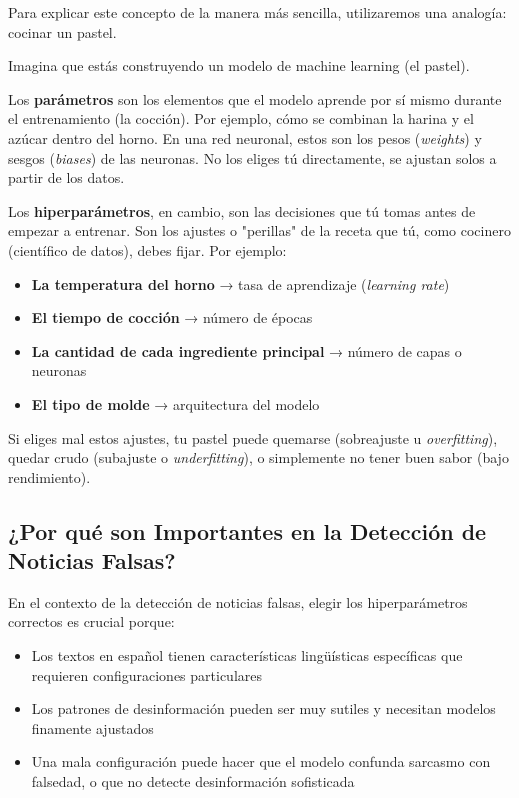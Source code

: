 Para explicar este concepto de la manera más sencilla, utilizaremos una analogía: cocinar un pastel.

Imagina que estás construyendo un modelo de machine learning (el pastel).

Los \textbf{parámetros} son los elementos que el modelo aprende por sí mismo durante el entrenamiento (la cocción). Por ejemplo, cómo se combinan la harina y el azúcar dentro del horno. En una red neuronal, estos son los pesos (\textit{weights}) y sesgos (\textit{biases}) de las neuronas. No los eliges tú directamente, se ajustan solos a partir de los datos.

Los \textbf{hiperparámetros}, en cambio, son las decisiones que tú tomas antes de empezar a entrenar. Son los ajustes o "perillas" de la receta que tú, como cocinero (científico de datos), debes fijar. Por ejemplo:

\begin{itemize}
    \item \textbf{La temperatura del horno} → tasa de aprendizaje (\textit{learning rate})
    \item \textbf{El tiempo de cocción} → número de épocas
    \item \textbf{La cantidad de cada ingrediente principal} → número de capas o neuronas
    \item \textbf{El tipo de molde} → arquitectura del modelo
\end{itemize}

Si eliges mal estos ajustes, tu pastel puede quemarse (sobreajuste u \textit{overfitting}), quedar crudo (subajuste o \textit{underfitting}), o simplemente no tener buen sabor (bajo rendimiento).

\subsection{¿Por qué son Importantes en la Detección de Noticias Falsas?}

En el contexto de la detección de noticias falsas, elegir los hiperparámetros correctos es crucial porque:

\begin{itemize}
    \item Los textos en español tienen características lingüísticas específicas que requieren configuraciones particulares
    \item Los patrones de desinformación pueden ser muy sutiles y necesitan modelos finamente ajustados
    \item Una mala configuración puede hacer que el modelo confunda sarcasmo con falsedad, o que no detecte desinformación sofisticada
\end{itemize}

